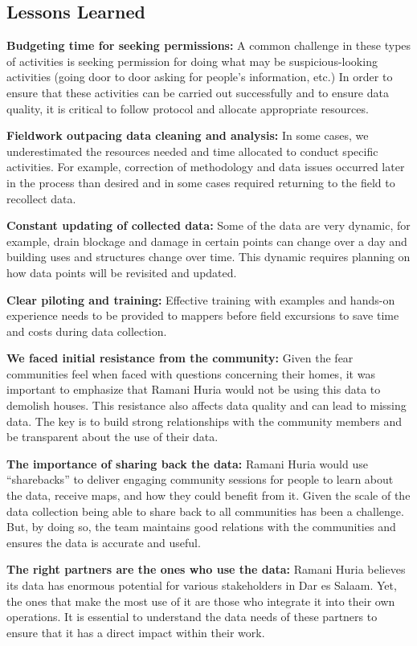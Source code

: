 \documentclass[a4paper,12pt,twoside]{article}
\begin{document}
\subsection{Lessons Learned}
\begin{multicols}{2}
\textbf{Budgeting time for seeking permissions:} A common challenge in these types of activities is seeking permission for doing what may be suspicious-looking activities (going door to door asking for people’s information, etc.) In order to ensure that these activities can be carried out successfully and to ensure data quality, it is critical to follow protocol and allocate appropriate resources.

\textbf{Fieldwork outpacing data cleaning and analysis:} In some cases, we underestimated the resources needed and time allocated to conduct specific activities. For example, correction of methodology and data issues occurred later in the process than desired and in some cases required returning to the field to recollect data.   

\textbf{Constant updating of collected data:} Some of the data are very dynamic, for example, drain blockage and damage in certain points can change over a day and building uses and structures change over time. This dynamic requires planning on how data points will be revisited and updated. 

\textbf{Clear piloting and training:} Effective training with examples and hands-on experience needs to be provided to mappers before field excursions to save time and costs during data collection.

\textbf{We faced initial resistance from the community:} Given the fear communities feel when faced with questions concerning their homes, it was important to emphasize that Ramani Huria would not be using this data to demolish houses. This resistance also affects data quality and can lead to missing data. The key is to build strong relationships with the community members and be transparent about the use of their data.

\textbf{The importance of sharing back the data:} Ramani Huria would use “sharebacks” to deliver engaging community sessions for people to learn about the data, receive maps, and how they could benefit from it. Given the scale of the data collection being able to share back to all communities has been a challenge. But, by doing so, the team maintains good relations with the communities and ensures the data is accurate and useful. 

\textbf{The right partners are the ones who use the data:} Ramani Huria believes its data has enormous potential for various stakeholders in Dar es Salaam. Yet, the ones that make the most use of it are those who integrate it into their own operations. It is essential to understand the data needs of these partners to ensure that it has a direct impact within their work. 


\end{multicols}
\end{document}
